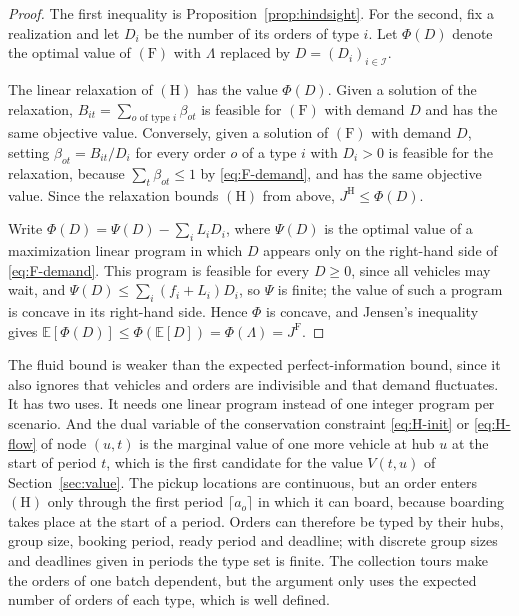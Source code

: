 \documentclass[12pt]{article}
\theoremstyle{plain}
\theoremstyle{definition}
\begin{document}
\begin{proof}
The first inequality is Proposition~\ref{prop:hindsight}. For the second, fix a realization and let $D_i$ be the number of its orders of type $i$. Let $\Phi(D)$ denote the optimal value of $(\mathrm{F})$ with $\Lambda$ replaced by $D=(D_i)_{i\in\mathcal{I}}$.

The linear relaxation of $(\mathrm{H})$ has the value $\Phi(D)$. Given a solution of the relaxation, $B_{it}=\sum_{o\text{ of type }i}\beta_{ot}$ is feasible for $(\mathrm{F})$ with demand $D$ and has the same objective value. Conversely, given a solution of $(\mathrm{F})$ with demand $D$, setting $\beta_{ot}=B_{it}/D_i$ for every order $o$ of a type $i$ with $D_i>0$ is feasible for the relaxation, because $\sum_t\beta_{ot}\le 1$ by \eqref{eq:F-demand}, and has the same objective value. Since the relaxation bounds $(\mathrm{H})$ from above, $J^{\mathrm{H}}\le\Phi(D)$.

Write $\Phi(D)=\Psi(D)-\sum_i L_iD_i$, where $\Psi(D)$ is the optimal value of a maximization linear program in which $D$ appears only on the right-hand side of \eqref{eq:F-demand}. This program is feasible for every $D\ge 0$, since all vehicles may wait, and $\Psi(D)\le\sum_i(f_i+L_i)D_i$, so $\Psi$ is finite; the value of such a program is concave in its right-hand side. Hence $\Phi$ is concave, and Jensen's inequality gives $\mathbb{E}[\Phi(D)]\le\Phi(\mathbb{E}[D])=\Phi(\Lambda)=J^{\mathrm{F}}$.
\end{proof}

The fluid bound is weaker than the expected perfect-information bound, since it also ignores that vehicles and orders are indivisible and that demand fluctuates. It has two uses. It needs one linear program instead of one integer program per scenario. And the dual variable of the conservation constraint \eqref{eq:H-init} or \eqref{eq:H-flow} of node $(u,t)$ is the marginal value of one more vehicle at hub $u$ at the start of period $t$, which is the first candidate for the value $V(t,u)$ of Section~\ref{sec:value}. The pickup locations are continuous, but an order enters $(\mathrm{H})$ only through the first period $\lceil a_o\rceil$ in which it can board, because boarding takes place at the start of a period. Orders can therefore be typed by their hubs, group size, booking period, ready period and deadline; with discrete group sizes and deadlines given in periods the type set is finite. The collection tours make the orders of one batch dependent, but the argument only uses the expected number of orders of each type, which is well defined.
\end{document}

